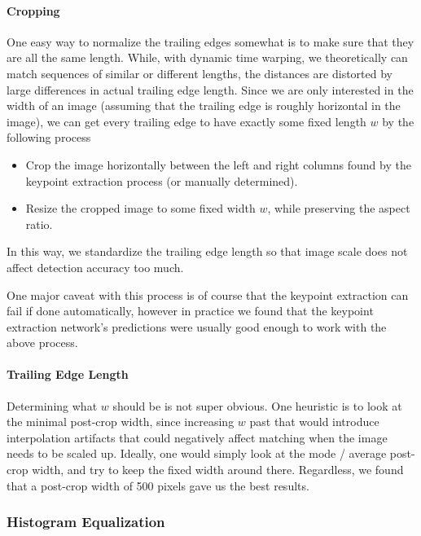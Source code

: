 \paragraph{Cropping}

One easy way to normalize the trailing edges somewhat is to make sure that they are all the same length.
While, with dynamic time warping, we theoretically can match sequences of similar or different lengths, the distances are distorted by large differences in actual trailing edge length.
Since we are only interested in the width of an image (assuming that the trailing edge is roughly horizontal in the image), we can get every trailing edge to have exactly some fixed length $w$ by the following process

\begin{itemize}
    \item Crop the image horizontally between the left and right columns found by the keypoint extraction process (or manually determined).
    \item Resize the cropped image to some fixed width $w$, while preserving the aspect ratio.
\end{itemize}

In this way, we standardize the trailing edge length so that image scale does not affect detection accuracy too much.

One major caveat with this process is of course that the keypoint extraction can fail if done automatically, however in practice we found that the keypoint extraction network's predictions were usually good enough to work with the above process.


\paragraph{Trailing Edge Length}

Determining what $w$ should be is not super obvious.
One heuristic is to look at the minimal post-crop width, since increasing $w$ past that would introduce interpolation artifacts that could negatively affect matching when the image needs to be scaled up.
Ideally, one would simply look at the mode / average post-crop width, and try to keep the fixed width around there.
Regardless, we found that a post-crop width of 500 pixels gave us the best results. %

\subsubsection{Histogram Equalization}

